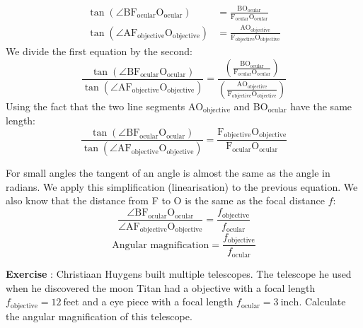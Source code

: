 \documentclass[12pt,a4paper]{article}
\numberwithin{equation}{section}
\numberwithin{figure}{section}
\newcounter{Exercise}
\numberwithin{table}{section}
\begin{document}
\begin{align} \tan (\angle \mbox{BF}_{\mbox{ocular}} \mbox{O}_{\mbox{ocular}} ) &= \frac{\mbox{BO}_{\mbox{ocular}}}{\mbox{F}_{\mbox{ocular}}\mbox{O}_{\mbox{ocular}}} \\
\tan (\angle \mbox{AF}_{\mbox{objective}} \mbox{O}_{\mbox{objective}} ) &= \frac{\mbox{AO}_{\mbox{objective}}}{\mbox{F}_{\mbox{objective}}\mbox{O}_{\mbox{objective}}}
\end{align}
We divide the first equation by the second:
\begin{equation}
\frac{\tan (\angle \mbox{BF}_{\mbox{ocular}} \mbox{O}_{\mbox{ocular}} )}{\tan (\angle \mbox{AF}_{\mbox{objective}} \mbox{O}_{\mbox{objective}} )} = \frac{\left( \frac{\mbox{BO}_{\mbox{ocular}}}{\mbox{F}_{\mbox{ocular}}\mbox{O}_{\mbox{ocular}}} \right)}{\left( \frac{\mbox{AO}_{\mbox{objective}}}{\mbox{F}_{\mbox{objective}}\mbox{O}_{\mbox{objective}}} \right)}
\end{equation}
Using the fact that the two line segments AO$_{\mbox{objective}}$ and BO$_{\mbox{ocular}}$ have the same length:
\begin{equation}
\frac{\tan (\angle \mbox{BF}_{\mbox{ocular}} \mbox{O}_{\mbox{ocular}} )}{\tan (\angle \mbox{AF}_{\mbox{objective}} \mbox{O}_{\mbox{objective}} )} = \frac{\mbox{F}_{\mbox{objective}}\mbox{O}_{\mbox{objective}}}{\mbox{F}_{\mbox{ocular}}\mbox{O}_{\mbox{ocular}}}
\end{equation}

For small angles the tangent of an angle is almost the same as the angle in radians. We apply this simplification (linearisation) to the previous equation. We also know that the distance from F to O is the same as the focal distance $f$:
\begin{equation}
\frac{\angle \mbox{BF}_{\mbox{ocular}} \mbox{O}_{\mbox{ocular}} }{\angle \mbox{AF}_{\mbox{objective}} \mbox{O}_{\mbox{objective}} } = \frac{f_{\mbox{objective}}}{f_{\mbox{ocular}}}
\end{equation}
\begin{equation} \mbox{Angular magnification} = \frac{f_{\mbox{objective}}}{f_{\mbox{ocular}}} \end{equation}

\begin{shaded}
\textbf{Exercise \theExercise {}} : Christiaan Huygens built multiple telescopes. The telescope he used when he discovered the moon Titan had a objective with a focal length $f_{\mbox{objective}}=12~\mbox{feet}$ and a eye piece with a focal length $f_{\mbox{ocular}}=3~\mbox{inch}$. Calculate the angular magnification of this telescope.\end{shaded}
\end{document}
